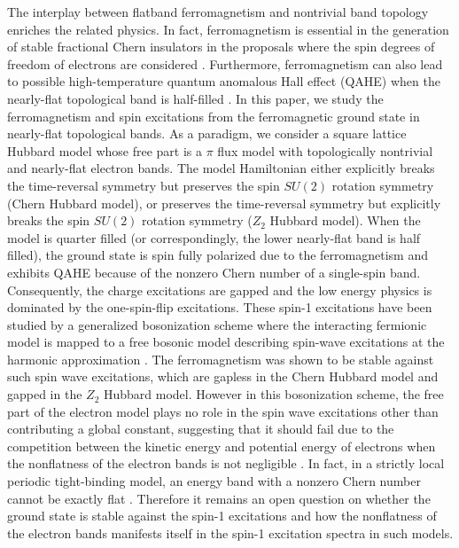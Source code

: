 \documentclass[amsmath,superscriptaddress,showpacs,aps,prb,twocolumn]{revtex4-1}
\begin{document}
\par The interplay between flatband ferromagnetism and nontrivial band topology enriches the related physics. In fact, ferromagnetism is essential in the generation of stable fractional Chern insulators in the proposals where the spin degrees of freedom of electrons are considered \cite{TMW_PRL2011,NSRCM_PRB2011,LBFL_PRL2012}. Furthermore, ferromagnetism can also lead to possible high-temperature quantum anomalous Hall effect (QAHE) when the nearly-flat topological band is half-filled \cite{NSRCM_PRL2012}. In this paper, we study the ferromagnetism and  spin excitations from the ferromagnetic ground state in nearly-flat topological bands. As a paradigm, we consider a square lattice Hubbard model whose free part is a $\pi$ flux model with topologically nontrivial and nearly-flat electron bands. The model Hamiltonian either explicitly breaks the time-reversal symmetry but preserves the spin $SU(2)$ rotation symmetry (Chern Hubbard model), or preserves the time-reversal symmetry but explicitly breaks the spin $SU(2)$ rotation symmetry ($Z_2$ Hubbard model). When the model is quarter filled (or correspondingly, the lower nearly-flat band is half filled), the ground state is spin fully polarized due to the ferromagnetism and exhibits QAHE because of the nonzero Chern number of a single-spin band. Consequently, the charge excitations are gapped and the low energy physics is dominated by the one-spin-flip excitations. These spin-1 excitations have been studied by a generalized bosonization scheme where the interacting fermionic model is mapped to a free bosonic model describing spin-wave excitations at the harmonic approximation \cite{DG_PRB2015}. The ferromagnetism was shown to be stable against such spin wave excitations, which are gapless in the Chern Hubbard model and gapped in the $Z_2$ Hubbard model. However in this bosonization scheme, the free part of the electron model plays no role in the spin wave excitations other than contributing a global constant, suggesting that it should fail due to the competition between the kinetic energy and potential energy of electrons when the nonflatness of the electron bands is not negligible \cite{T_PRL1994}. In fact, in a strictly local periodic tight-binding model, an energy band with a nonzero Chern number cannot be exactly flat \cite{CMST_JPMT2014}. Therefore it remains an open question on whether the ground state is stable against the spin-1 excitations and how the nonflatness of the electron bands manifests itself in the spin-1 excitation spectra in such models.
\end{document}
